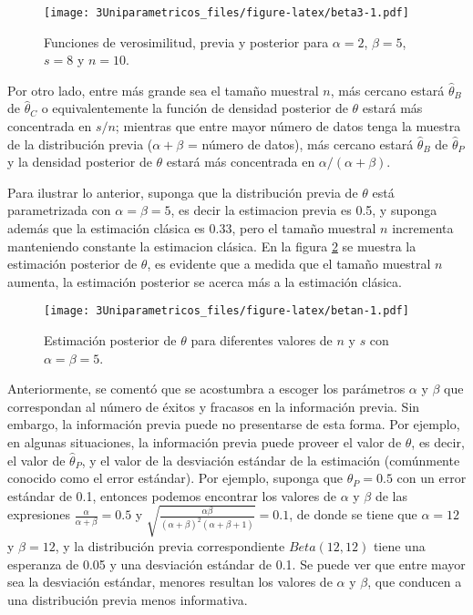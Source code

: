 \documentclass[
  spanish,
]{book}
\theoremstyle{definition}
\theoremstyle{definition}
\theoremstyle{definition}
\theoremstyle{definition}
\theoremstyle{remark}
\begin{document}
\begin{figure}
\centering
\texttt{[image: 3Uniparametricos\_files/figure-latex/beta3-1.pdf]}
\caption{\label{fig:beta3}Funciones de verosimilitud, previa y posterior para \(\alpha=2\), \(\beta=5\), \(s=8\) y \(n=10\).}
\end{figure}

Por otro lado, entre más grande sea el tamaño muestral \(n\), más
cercano estará \(\hat{\theta}_{B}\) de \(\hat{\theta}_{C}\) o
equivalentemente la función de densidad posterior de \(\theta\) estará más
concentrada en \(s/n\); mientras que entre mayor número de datos tenga la
muestra de la distribución previa (\(\alpha+\beta\) = número de datos), más
cercano estará \(\hat{\theta}_{B}\) de \(\hat{\theta}_{P}\) y la densidad
posterior de \(\theta\) estará más concentrada en \(\alpha/(\alpha+\beta)\).

Para ilustrar lo anterior, suponga que la distribución previa de
\(\theta\) está parametrizada con \(\alpha=\beta=5\), es decir la estimacion previa es 0.5, y suponga además que la estimación clásica es 0.33, pero el tamaño muestral \(n\) incrementa manteniendo constante la estimacion
clásica. En la figura \ref{fig:betan} se muestra la estimación posterior de
\(\theta\), es evidente que a medida que el tamaño muestral \(n\) aumenta,
la estimación posterior se acerca más a la estimación clásica.

\begin{figure}
\centering
\texttt{[image: 3Uniparametricos\_files/figure-latex/betan-1.pdf]}
\caption{\label{fig:betan}Estimación posterior de \(\theta\) para diferentes valores de \(n\) y \(s\) con \(\alpha=\beta=5\).}
\end{figure}

Anteriormente, se comentó que se acostumbra a escoger los parámetros
\(\alpha\) y \(\beta\) que correspondan al número de éxitos y fracasos en la
información previa. Sin embargo, la información previa puede no
presentarse de esta forma. Por ejemplo, en algunas situaciones, la
información previa puede proveer el valor de \(\theta\), es decir, el
valor de \(\hat{\theta}_P\), y el valor de la desviación estándar de la
estimación (comúnmente conocido como el error estándar). Por ejemplo,
suponga que \(\hat{\theta}_P=0.5\) con un error estándar de 0.1, entonces
podemos encontrar los valores de \(\alpha\) y \(\beta\) de las expresiones
\(\frac{\alpha}{\alpha+\beta}=0.5\) y
\(\sqrt{\frac{\alpha\beta}{(\alpha+\beta)^2(\alpha+\beta+1)}}=0.1\), de
donde se tiene que \(\alpha=12\) y \(\beta=12\), y la distribución previa
correspondiente \(Beta(12, 12)\) tiene una esperanza de 0.05 y una
desviación estándar de 0.1. Se puede ver que entre mayor sea la
desviación estándar, menores resultan los valores de \(\alpha\) y \(\beta\),
que conducen a una distribución previa menos informativa.
\end{document}
